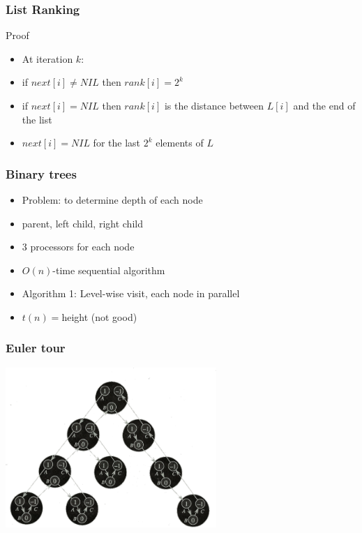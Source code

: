 \documentclass[12pt,aspectratio=169]{beamer}
\begin{document}
\begin{frame}\frametitle{List Ranking}
\begin{block}{Proof}
  \begin{itemize}
  \item
    At iteration $k$:
  \item
    if $next[i] \neq NIL$ then $rank[i] = 2^{k}$
  \item
    if $next[i] = NIL$ then $rank[i]$ is the distance between $L[i]$ and the end of the
    list
  \item
    $next[i] = NIL$ for the last $2^{k}$ elements of $L$
  \end{itemize}
\end{block}
\end{frame}
\begin{frame}\frametitle{Binary trees}
  \begin{itemize}
  \item
    Problem: to determine depth of each node
  \item
    parent, left child, right child
  \item
    $3$ processors for each node
  \item
    $O(n)$-time sequential algorithm
  \item
    Algorithm 1: Level-wise visit, each node in parallel
  \item
    $t(n)=$height (not good)
  \end{itemize}
\end{frame}


\begin{frame}\frametitle{Euler tour}
  \begin{center}
    \includegraphics[width=8cm]{img/euler1}
  \end{center}

\end{frame}
\end{document}
